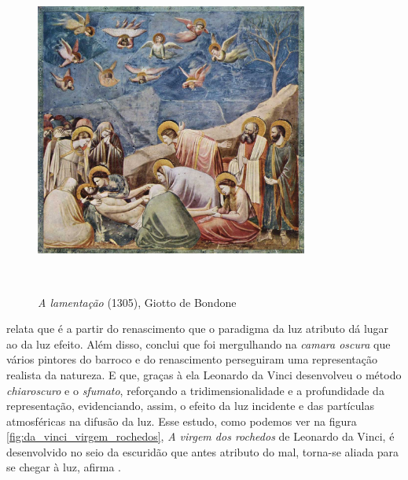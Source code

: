 \begin{figure}[H]
  \begin{center}
    \caption{\textit{A lamentação} (1305), Giotto de Bondone}
    \vspace*{0,2cm}
    \includegraphics[width=0.8\textwidth]{./04-figuras/giotto_lamentacao}
    \label{fig:giotto_lamentacao}
  \end{center}
  \vspace*{-0,9cm}
  \\
\end{figure}


 relata que é a partir do renascimento que o paradigma da luz atributo dá lugar ao da luz efeito. Além disso, conclui que foi mergulhando na \textit{camara oscura} que vários pintores do barroco e do renascimento perseguiram uma representação realista da natureza. E que, graças à ela Leonardo da Vinci desenvolveu o método \textit{chiaroscuro} e o \textit{sfumato}, reforçando a tridimensionalidade e a profundidade da representação, evidenciando, assim, o efeito da luz incidente e das partículas atmosféricas na difusão da luz. Esse estudo,  como podemos ver na figura \ref{fig:da_vinci_virgem_rochedos}, \textit{A virgem dos rochedos} de Leonardo da Vinci, é desenvolvido no seio da escuridão que antes atributo do mal, torna-se aliada para se chegar à luz, afirma .

